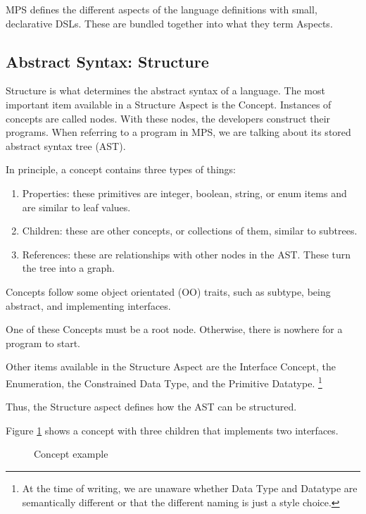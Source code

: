 MPS defines the different aspects of the language definitions with small, declarative DSLs.
These are bundled together into what they term Aspects.

\subsection{Abstract Syntax: Structure}
Structure is what determines the abstract syntax of a language.
The most important item available in a Structure Aspect is the Concept.
Instances of concepts are called nodes.
With these nodes, the developers construct their programs.
When referring to a program in MPS, we are talking about its stored abstract syntax tree (AST).

In principle, a concept contains three types of things:
\begin{enumerate}
    \setlength\itemsep{0em}
    \item Properties: these primitives are integer, boolean, string, or enum items and are similar to leaf values.
    \item Children: these are other concepts, or collections of them, similar to subtrees.
    \item References: these are relationships with other nodes in the AST. These turn the tree into a graph.
\end{enumerate}

Concepts follow some object orientated (OO) traits, such as subtype, being abstract, and implementing interfaces.

One of these Concepts must be a root node. 
Otherwise, there is nowhere for a program to start.

Other items available in the Structure Aspect are the Interface Concept, the Enumeration, the Constrained Data Type, and the Primitive Datatype.
\footnote{At the time of writing, we are unaware whether Data Type and Datatype are semantically different or that the different naming is just a style choice.}

Thus, the Structure aspect defines how the AST can be structured.

Figure \ref{fig:concept_example} shows a concept with three children that implements two interfaces.

\begin{figure}
    \centering
    \caption{Concept example}
    \label{fig:concept_example}
\end{figure}
 
